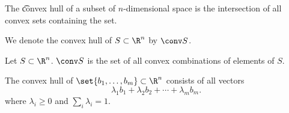 
\sbasic
































\sstart
{}



The \t{convex hull} of a subset of $n$-dimensional space is the intersection of all convex sets containing the set.


We denote the convex hull of $S \subset \R^n$ by $\conv S$.



\begin{prop}
  Let $S \subset \R^n$. $\conv S$ is the set of all convex combinations of elements of $S$.
\end{prop}

\begin{prop}
  The convex hull of $\set{b_1, \dots, b_m} \subset \R^n$ consists of all vectors
  $$
    \lambda_1b_1 + \lambda_2b_2 + \cdots + \lambda_mb_m.
  $$
  where $\lambda_i \geq 0$ and $\sum_{i}\lambda_i = 1$.
\end{prop}
\strats
